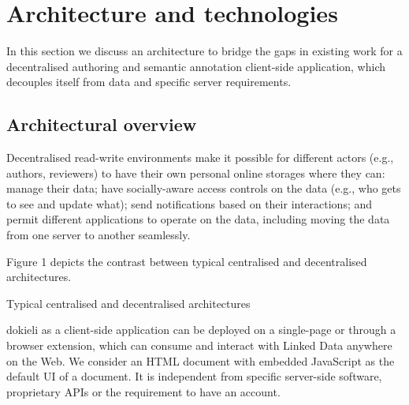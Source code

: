 \documentclass[a4paper]{llncs}
\begin{document}
                    

                    
                        \section{Architecture and technologies}
  \label{architecture-and-technologies}

                        
                            
\par In this section we discuss an architecture to bridge the gaps in existing work for a decentralised authoring and semantic annotation client-side application, which decouples itself from data and specific server requirements.

                            
                                \subsection{Architectural overview}
  \label{architectural-overview}

                                
                                    
\par Decentralised read-write environments make it possible for different actors (e.g., authors, reviewers) to have their own personal online storages where they can: manage their data; have socially-aware access controls on the data (e.g., who gets to see and update what); send notifications based on their interactions; and permit different applications to operate on the data, including moving the data from one server to another seamlessly.

                                    
\par Figure 1 depicts the contrast between typical centralised and decentralised architectures.

                                    
                                        
                                        Typical centralised and decentralised architectures
                                    

                                    
\par dokieli as a client-side application can be \empty deployed on a single-page or through a browser extension, which can consume and interact with Linked Data anywhere on the Web. We consider an HTML document with embedded JavaScript as the default UI of a document. It is independent from specific server-side software, proprietary APIs or the requirement to have an account.
\end{document}

